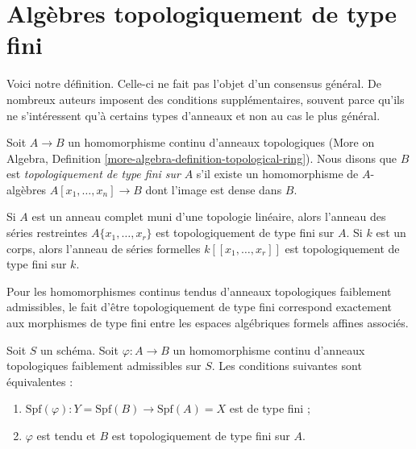 \section{Algèbres topologiquement de type fini}
\label{section-tft}

\noindent
Voici notre définition. Celle-ci ne fait pas l'objet d'un consensus général.
De nombreux auteurs imposent des conditions supplémentaires, souvent parce qu'ils ne
s'intéressent qu'à certains types d'anneaux et non au cas le plus général.

\begin{definition}
\label{definition-topologically-finite-type}
Soit $A \to B$ un homomorphisme continu d'anneaux topologiques
(More on Algebra, Definition \ref{more-algebra-definition-topological-ring}).
Nous disons que $B$ est {\it topologiquement de type fini sur} $A$ s'il
existe un homomorphisme de $A$-algèbres $A[x_1, \ldots, x_n] \to B$ dont
l'image est dense dans $B$.
\end{definition}

\noindent
Si $A$ est un anneau complet muni d'une topologie linéaire, alors l'anneau des
séries restreintes $A\{x_1, \ldots, x_r\}$ est topologiquement de type
fini sur $A$. Si $k$ est un corps, alors l'anneau de séries formelles
$k[[x_1, \ldots, x_r]]$ est topologiquement de type fini sur $k$.

\medskip\noindent
Pour les homomorphismes continus tendus d'anneaux topologiques faiblement admissibles,
le fait d'être topologiquement de type fini correspond exactement aux morphismes
de type fini entre les espaces algébriques formels affines associés.

\begin{lemma}
\label{lemma-topologically-finite-type-finite-type}
Soit $S$ un schéma. Soit $\varphi : A \to B$ un homomorphisme continu d'anneaux
topologiques faiblement admissibles sur $S$. Les conditions suivantes
sont équivalentes :
\begin{enumerate}
\item $\text{Spf}(\varphi) : Y = \text{Spf}(B) \to \text{Spf}(A) = X$
est de type fini ;
\item $\varphi$ est tendu et $B$ est topologiquement de type fini sur $A$.
\end{enumerate}
\end{lemma}

